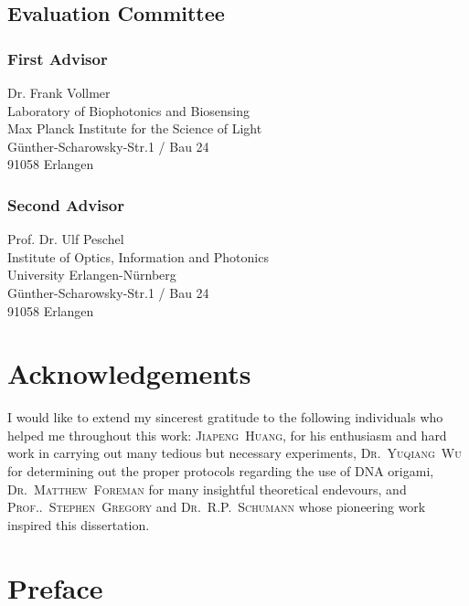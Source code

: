 \documentclass[a4paper,titlepage,onecolumn]{report}
\begin{document}
\section*{Evaluation Committee}
\subsection*{First Advisor}
Dr. Frank Vollmer\\
Laboratory of Biophotonics and Biosensing\\
Max Planck Institute for the Science of Light\\
G\"unther-Scharowsky-Str.1 / Bau 24\\
91058 Erlangen
\subsection*{Second Advisor}
Prof. Dr. Ulf Peschel\\
Institute of Optics, Information and Photonics\\
University Erlangen-N\"urnberg\\
G\"unther-Scharowsky-Str.1 / Bau 24\\
91058 Erlangen

\newpage
\chapter*{Acknowledgements}
I would like to extend my sincerest gratitude to the following individuals
who helped me throughout this work: \textsc{Jiapeng~Huang}, for his
enthusiasm and hard work in carrying out many tedious but necessary
experiments, \textsc{Dr\@.~Yuqiang~Wu} for determining out the proper
protocols regarding the use of DNA origami, \textsc{Dr\@.~Matthew~Foreman}
for many insightful theoretical endevours, and
\textsc{Prof.\@.~Stephen~Gregory} and \textsc{Dr\@.~R\@.P.\@~Schumann} whose
pioneering work inspired this dissertation.

\tableofcontents

\begin{abstract}
\end{abstract}

\chapter{Preface}
\end{document}
